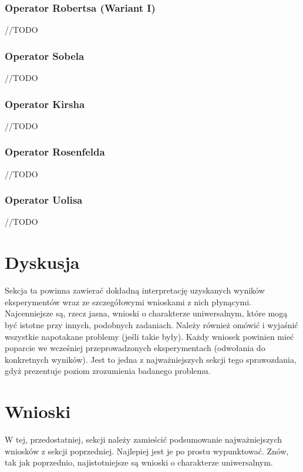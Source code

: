 \documentclass{classrep}
\begin{document}
\subsubsection{Operator Robertsa (Wariant I)}
//TODO

\subsubsection{Operator Sobela}
//TODO

\subsubsection{Operator Kirsha}
//TODO

\subsubsection{Operator Rosenfelda}
//TODO

\subsubsection{Operator Uolisa}
//TODO

\section{Dyskusja}
{\color{blue}
Sekcja ta powinna zawierać dokładną interpretację uzyskanych wyników
eksperymentów wraz ze szczegółowymi wnioskami z nich płynącymi. Najcenniejsze
są, rzecz jasna, wnioski o charakterze uniwersalnym, które mogą być istotne
przy innych, podobnych zadaniach. Należy również omówić i wyjaśnić wszystkie
napotakane problemy (jeśli takie były). Każdy wniosek powinien mieć poparcie
we wcześniej przeprowadzonych eksperymentach (odwołania do konkretnych
wyników). Jest to jedna z najważniejszych sekcji tego sprawozdania, gdyż
prezentuje poziom zrozumienia badanego problemu.}
\section{Wnioski}
{\color{blue}W tej, przedostatniej, sekcji należy zamieścić podsumowanie
najważniejszych wniosków z sekcji poprzedniej. Najlepiej jest je po prostu
wypunktować. Znów, tak jak poprzednio, najistotniejsze są wnioski o
charakterze uniwersalnym.}


\begin{thebibliography}{1}
\\



\end{thebibliography}
\end{document}
